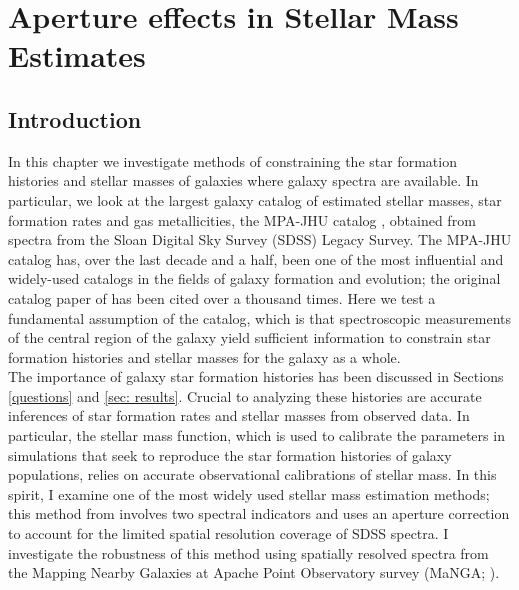 \chapter{Aperture effects in Stellar Mass Estimates}

\label{ch:acm}
\newpage

\section{Introduction}
\label{ch2_intro}

In this chapter we investigate methods of constraining the star formation histories and stellar masses of galaxies where galaxy spectra are available. In particular, we look at the largest galaxy catalog of estimated stellar masses, star formation rates and gas metallicities, the MPA-JHU catalog \citep{brinchmann_physical_2004, kauffmann_stellar_2003, tremonti_origin_2004}, obtained from spectra from the Sloan Digital Sky Survey (SDSS) Legacy Survey. The MPA-JHU catalog has, over the last decade and a half, been one of the most influential and widely-used catalogs in the fields of galaxy formation and evolution; the original catalog paper of \citet{kauffmann_stellar_2003} has been cited over a thousand times. Here we test a fundamental assumption of the catalog, which is that spectroscopic measurements of the central region of the galaxy yield sufficient information to constrain star formation histories and stellar masses for the galaxy as a whole.\\

The importance of galaxy star formation histories has been discussed in Sections \ref{questions} and  \ref{sec: results}. Crucial to analyzing these histories are accurate inferences of star formation rates and stellar masses from observed data. In particular, the stellar mass function, which is used to calibrate the parameters in simulations that seek to reproduce the star formation histories of galaxy populations, relies on accurate observational calibrations of stellar mass. In this spirit, I examine one of the most widely used stellar mass estimation methods; this method from \citet{kauffmann_stellar_2003} involves two spectral indicators and uses an aperture correction to account for the limited spatial resolution coverage of SDSS spectra. I investigate the robustness of this method using spatially resolved spectra from the Mapping Nearby Galaxies at Apache Point Observatory survey (MaNGA; \citealt{bundy_overview_2014}).\\

